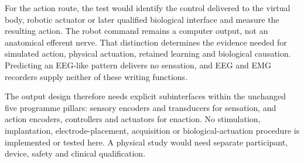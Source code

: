 For the action route, the test would identify the control delivered to the virtual body, robotic actuator or later qualified biological interface and measure the resulting action. The robot command remains a computer output, not an anatomical efferent nerve. That distinction determines the evidence needed for simulated action, physical actuation, retained learning and biological causation. Predicting an EEG-like pattern delivers no sensation, and EEG and EMG recorders supply neither of these writing functions.

The output design therefore needs explicit subinterfaces within the unchanged five programme pillars: sensory encoders and transducers for sensation, and action encoders, controllers and actuators for enaction. No stimulation, implantation, electrode-placement, acquisition or biological-actuation procedure is implemented or tested here. A physical study would need separate participant, device, safety and clinical qualification.

